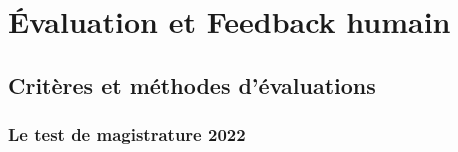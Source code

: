 
\chapter{Évaluation et Feedback humain} %

\label{ch:3} %

\section{Critères et méthodes d'évaluations}


\subsection{Le test de magistrature 2022}

